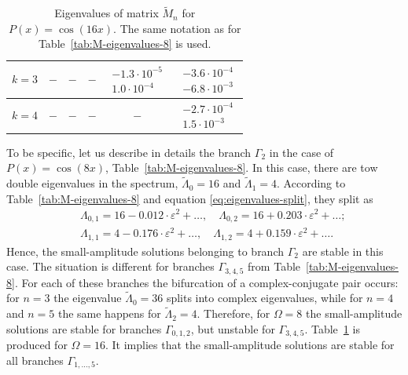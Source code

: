 \begin{table}[tbp]
\begin{tabular}{cccccc}
	$k = 3$ & $-$ & $-$ & $-$ & $\begin{array}{c} -1.3 \cdot 10^{-5} \\ 1.0 \cdot 10^{-4} \end{array}$ & $\begin{array}{c} -3.6 \cdot 10^{-4} \\ -6.8 \cdot 10^{-3} \end{array}$ \\ \hline
	$k = 4$ & $-$ & $-$ & $-$ & $-$ & $\begin{array}{c} -2.7 \cdot 10^{-4} \\ 1.5 \cdot 10^{-3} \end{array}$ \\ \hline
\end{tabular}
\caption{
	Eigenvalues of matrix $\widetilde{M}_n$ for $P(x) = \cos (16 x)$.
	The same notation as for Table~\ref{tab:M-eigenvalues-8} is used.
}
\label{tab:M-eigenvalues-16}
\end{table}

To be specific, let us describe in details the branch $\Gamma_2$ in the case of $P(x) = \cos (8x)$, Table~\ref{tab:M-eigenvalues-8}.
In this case, there are tow double eigenvalues in the spectrum, $\widetilde{\Lambda}_0 = 16$ and $\widetilde{\Lambda}_1 = 4$.
According to Table~\ref{tab:M-eigenvalues-8} and equation \eqref{eq:eigenvalues-split}, they split as
\begin{eqnarray}
	&& \Lambda_{0, 1} = 16 - 0.012 \cdot \varepsilon^2 + \dots, \quad \Lambda_{0, 2} = 16 + 0.203 \cdot \varepsilon^2 + \dots; \\
	&& \Lambda_{1, 1} = 4 - 0.176 \cdot \varepsilon^2 + \dots, \quad \Lambda_{1, 2} = 4 + 0.159 \cdot \varepsilon^2 + \dots.
\end{eqnarray}
Hence, the small-amplitude solutions belonging to branch $\Gamma_2$ are stable in this case.
The situation is different for branches $\Gamma_{3,4,5}$ from Table~\ref{tab:M-eigenvalues-8}.
For each of these branches the bifurcation of a complex-conjugate pair occurs: for $n = 3$ the eigenvalue $\widetilde{\Lambda}_0 = 36$ splits into complex eigenvalues, while for $n = 4$ and $n = 5$ the same happens for $\widetilde{\Lambda}_2 = 4$.
Therefore, for $\Omega = 8$ the small-amplitude solutions are stable  for branches $\Gamma_{0, 1, 2}$, but unstable for $\Gamma_{3, 4, 5}$.
Table~\ref{tab:M-eigenvalues-16} is produced for $\Omega = 16$.
It implies that the small-amplitude solutions are stable for all branches $\Gamma_{1, \dots, 5}$.

